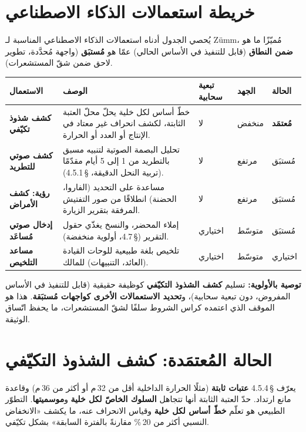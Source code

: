 \section{خريطة استعمالات الذكاء الاصطناعي}
يُحصي الجدول أدناه استعمالات الذكاء الاصطناعي المناسبة لـ Zümm، مُميّزًا ما هو
\textbf{ضمن النطاق} (قابل للتنفيذ في الأساس الحالي) عمّا هو \textbf{مُستبَق}
(واجهة مُحدَّدة، تطوير لاحق ضمن شقّ المستشعرات).

\begin{xltabular}{\textwidth}{>{\bfseries}p{3.1cm} X C{1.7cm} C{1.6cm} C{1.9cm}}
\toprule
\textbf{الاستعمال} & \textbf{الوصف} & \textbf{تبعية سحابية} & \textbf{الجهد} & \textbf{الحالة} \\
\midrule
\endhead
كشف شذوذ تكيّفي &
خطّ أساس لكل خلية يحلّ محلّ العتبة الثابتة، لكشف انحراف غير معتاد في الإنتاج أو
العدد أو الحرارة. &
لا & منخفض & \textbf{مُعتمَد} \\
كشف صوتي للتطريد &
تحليل البصمة الصوتية لتنبيه مسبق بالتطريد من 1 إلى 5 أيام مقدّمًا (تربية النحل
الدقيقة، §\,4.5.1). &
لا & مرتفع & مُستبَق \\
رؤية: كشف الأمراض &
مساعدة على التحديد (الفاروا، الحضنة) انطلاقًا من صور التفتيش المرفقة بتقرير
الزيارة. &
لا & مرتفع & مُستبَق \\
إدخال صوتي مُساعَد &
إملاء المحضر، والنسخ يغذّي حقول التقرير (§\,4.7، أولوية منخفضة). &
اختياري & متوسّط & مُستبَق \\
مساعد التلخيص &
تلخيص بلغة طبيعية للوحات القيادة (العائد، التنبيهات) للمالك. &
اختياري & متوسّط & اختياري \\
\bottomrule
\end{xltabular}

\begin{encadre}
\textbf{توصية بالأولوية:} تسليم \textbf{كشف الشذوذ التكيّفي} كوظيفة حقيقية (قابل
للتنفيذ في الأساس المفروض، دون تبعية سحابية)، و\textbf{تحديد الاستعمالات الأخرى
كواجهات مُستبَقة}. هذا هو الموقف الذي اعتمده كراس الشروط سلفًا لشقّ المستشعرات،
ما يحفظ اتّساق الوثيقة.
\end{encadre}

\section{الحالة المُعتمَدة: كشف الشذوذ التكيّفي}
يعرّف §\,4.5.4 \textbf{عتبات ثابتة} (مثلًا الحرارة الداخلية أقل من
32\,\textdegree م أو أكثر من 36\,\textdegree م) وقاعدة مانع ارتداد. حدّ العتبة
الثابتة أنها تتجاهل \textbf{السلوك الخاصّ لكل خلية} و\textbf{موسميتها}. التطوّر
الطبيعي هو تعلّم \textbf{خطّ أساس لكل خلية} وقياس الانحراف عنه، ما يكشف «الانخفاض
النسبي أكثر من 20\,\% مقارنةً بالفترة السابقة» بشكل تكيّفي.


